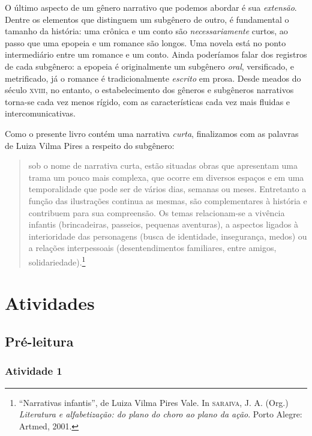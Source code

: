 \documentclass[11pt]{extarticle}
\begin{document}
O último aspecto de um gênero narrativo que podemos abordar é sua 
\textit{extensão}. Dentre os elementos que distinguem um subgênero 
de outro, é fundamental o tamanho da história: uma crônica e um conto são \textit{necessariamente}
curtos, ao passo que uma epopeia e um romance são longos. Uma novela
está no ponto intermediário entre um romance e um conto.
Ainda poderíamos falar dos registros de cada subgênero: 
a epopeia é originalmente um subgênero \textit{oral}, versificado, e metrificado,
já o romance é tradicionalmente \textit{escrito} em prosa. 
Desde meados do século \textsc{xviii}, no entanto, o estabelecimento
dos gêneros e subgêneros narrativos torna-se cada vez menos rígido,
com as características cada vez mais fluidas e intercomunicativas.

Como o presente livro contém uma narrativa \textit{curta},
finalizamos com as palavras de Luiza Vilma Pires a respeito do
subgênero:

\begin{quote}
sob o nome de narrativa curta, estão situadas obras que apresentam uma trama 
um pouco mais complexa, que ocorre em diversos espaços e em uma temporalidade 
que pode ser de vários dias, semanas ou meses. Entretanto a função das ilustrações 
continua as mesmas, são complementares à história e contribuem para sua compreensão. 
Os temas relacionam-se a vivência infantis (brincadeiras, passeios, pequenas aventuras), 
a aspectos ligados à interioridade das personagens (busca de identidade, insegurança, 
medos) ou a relações interpessoais (desentendimentos familiares, entre amigos, solidariedade).\footnote{“Narrativas infantis”, de Luiza Vilma Pires Vale. In \textsc{saraiva}, J. A. (Org.) \textit{Literatura e alfabetização: do plano do choro ao plano da ação}. Porto Alegre: Artmed, 2001.} 
\end{quote}

\section{Atividades}

\subsection{Pré-leitura}

\subsubsection{Atividade 1}

\end{document}
